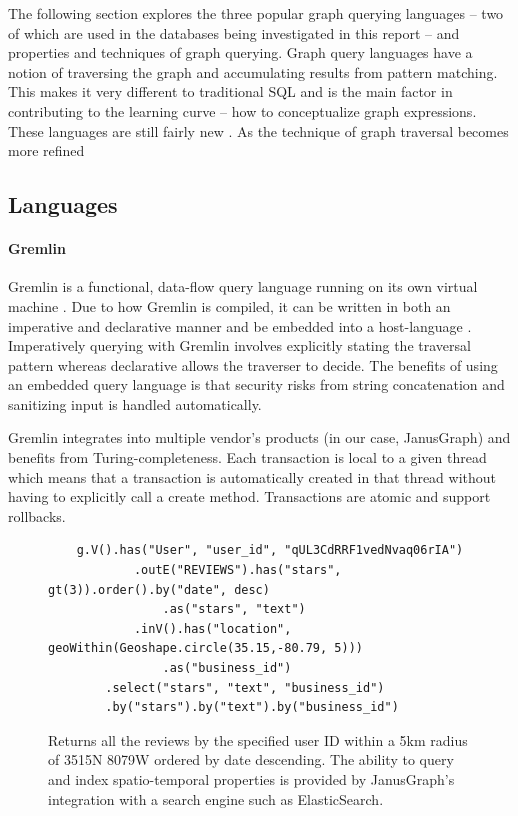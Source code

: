 The following section explores the three popular graph querying languages -- two of which are used in the databases being investigated in this report -- and properties and techniques of graph querying. Graph query languages have a notion of traversing the graph and accumulating results from pattern matching. This makes it very different to traditional SQL and is the main factor in contributing to the learning curve -- how to conceptualize graph expressions. These languages are still fairly new . As the technique of graph traversal becomes more refined 

\subsection{Languages}
\label{subsec:lang}

\paragraph{Gremlin}

Gremlin is a functional, data-flow query language running on its own virtual machine \cite{gremlin-tinkerpop}. Due to how Gremlin is compiled, it can be written in both an imperative and declarative manner and be embedded into a host-language \cite{tinkerpop-docs}. Imperatively querying with Gremlin involves explicitly stating the traversal pattern whereas declarative allows the traverser to decide. The benefits of using an embedded query language is that security risks from string concatenation and sanitizing input is handled automatically.

Gremlin integrates into multiple vendor's products (in our case, JanusGraph) and benefits from Turing-completeness. Each transaction is local to a given thread which means that a transaction is automatically created in that thread without having to explicitly call a create method. Transactions are atomic and support rollbacks.

\begin{figure}[h]
    \centering
    \begin{verbatim}
    g.V().has("User", "user_id", "qUL3CdRRF1vedNvaq06rIA")
            .outE("REVIEWS").has("stars", gt(3)).order().by("date", desc)
                .as("stars", "text")
            .inV().has("location", geoWithin(Geoshape.circle(35.15,-80.79, 5)))
                .as("business_id")
        .select("stars", "text", "business_id")
        .by("stars").by("text").by("business_id")
    \end{verbatim}
    \caption{Returns all the reviews by the specified user ID within a 5km radius of 35\degree 15N 80\degree 79W ordered by date descending. The ability to query and index spatio-temporal properties is provided by JanusGraph's integration with a search engine such as ElasticSearch.}
    \label{lst:gremlin-example-1}
\end{figure}

